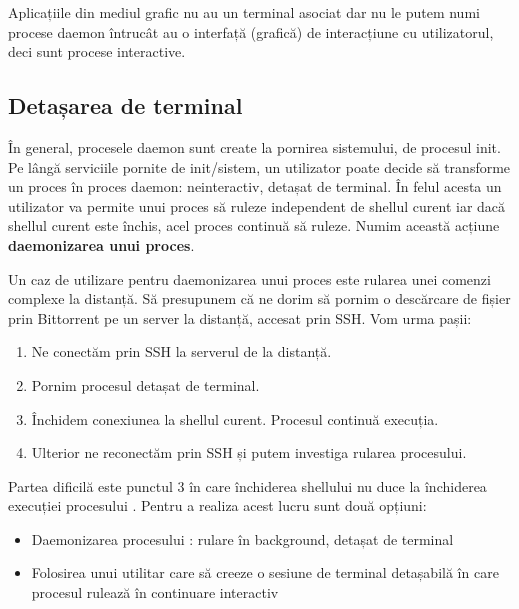 \begin{note}
  Aplicațiile din mediul grafic nu au un terminal asociat dar nu le putem numi procese daemon întrucât au o interfață (grafică) de interacțiune cu utilizatorul, deci sunt procese interactive.
\end{note}

\subsection{Detașarea de terminal}
\label{sec:process:detach}

În general, procesele daemon sunt create la pornirea sistemului, de procesul init.
Pe lângă serviciile pornite de init/sistem, un utilizator poate decide să transforme un proces în proces daemon: neinteractiv, detașat de terminal.
În felul acesta un utilizator va permite unui proces să ruleze independent de shellul curent iar dacă shellul curent este închis, acel proces continuă să ruleze.
Numim această acțiune \textbf{daemonizarea unui proces}.

Un caz de utilizare pentru daemonizarea unui proces este rularea unei comenzi complexe la distanță.
Să presupunem că ne dorim să pornim o descărcare de fișier prin Bittorrent pe un server la distanță, accesat prin SSH.
Vom urma pașii:

\begin{enumerate}
  \item Ne conectăm prin SSH la serverul de la distanță.
  \item Pornim procesul  detașat de terminal.
  \item Închidem conexiunea la shellul curent.
Procesul  continuă execuția.
  \item Ulterior ne reconectăm prin SSH și putem investiga rularea procesului.
\end{enumerate}

Partea dificilă este punctul 3 în care închiderea shellului nu duce la închiderea execuției procesului .
Pentru a realiza acest lucru sunt două opțiuni:

\begin{itemize}
  \item Daemonizarea procesului : rulare în background, detașat de terminal
  \item Folosirea unui utilitar care să creeze o sesiune de terminal detașabilă în care procesul rulează în continuare interactiv
\end{itemize}

